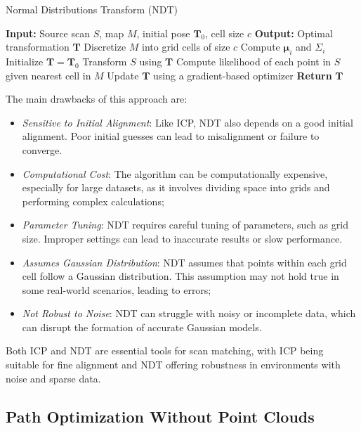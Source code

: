 \begin{algorithm}[H]
\caption{Normal Distributions Transform (NDT)}
\begin{algorithmic}[1]
\State \textbf{Input:} Source scan \( S \), map \( M \), initial pose \( \mathbf{T}_0 \), cell size \( c \)
\State \textbf{Output:} Optimal transformation \( \mathbf{T} \)
\State Discretize \( M \) into grid cells of size \( c \)
    \State Compute \( \boldsymbol{\mu}_i \) and \( \Sigma_i \)
\EndFor
\State Initialize \( \mathbf{T} = \mathbf{T}_0 \)
\Repeat
    \State Transform \( S \) using \( \mathbf{T} \)
    \State Compute likelihood of each point in \( S \) given nearest cell in \( M \)
    \State Update \( \mathbf{T} \) using a gradient-based optimizer
\State \textbf{Return} \( \mathbf{T} \)
\end{algorithmic}
\end{algorithm}

The main drawbacks of this approach are:
\begin{itemize}
    \item \textit{Sensitive to Initial Alignment}: Like ICP, NDT also depends on a good initial alignment. Poor initial guesses can lead to misalignment or failure to converge.
    \item \textit{Computational Cost}: The algorithm can be computationally expensive, especially for large datasets, as it involves dividing space into grids and performing complex calculations;
    \item \textit{Parameter Tuning}: NDT requires careful tuning of parameters, such as grid size. Improper settings can lead to inaccurate results or slow performance.
    \item \textit{Assumes Gaussian Distribution}: NDT assumes that points within each grid cell follow a Gaussian distribution. This assumption may not hold true in some real-world scenarios, leading to errors;
    \item \textit{Not Robust to Noise}: NDT can struggle with noisy or incomplete data, which can disrupt the formation of accurate Gaussian models.
\end{itemize}

Both ICP and NDT are essential tools for scan matching, with ICP being suitable for fine alignment and NDT offering robustness in environments with noise and sparse data.

\subsection*{Path Optimization Without Point Clouds}

